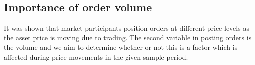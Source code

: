 
\subsection{Importance of order volume}
\label{sec:data-hypthesis-order-volume}

It was shown that market participants position orders at different price levels as the asset price is moving due to trading.
The second variable in posting orders is the volume and we aim to determine whether or not this is a factor which is affected during price movements in the given sample period.


